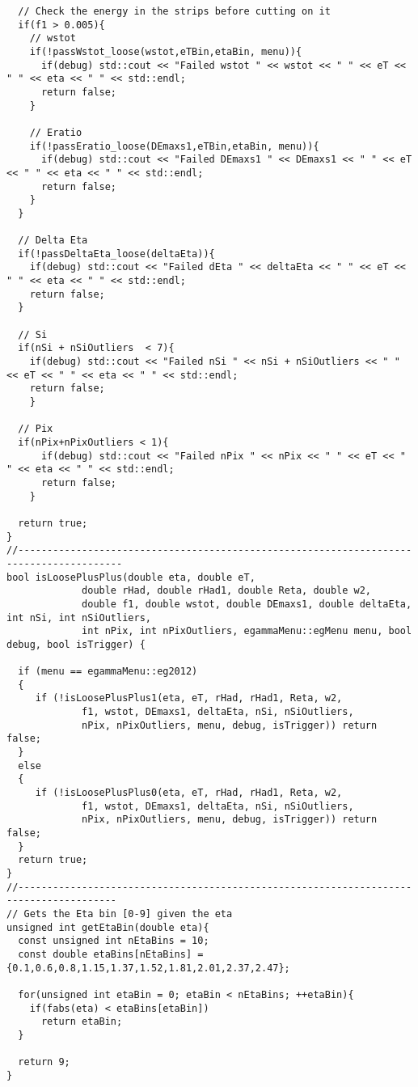 \begin{lstlisting}
  // Check the energy in the strips before cutting on it
  if(f1 > 0.005){
    // wstot
    if(!passWstot_loose(wstot,eTBin,etaBin, menu)){
      if(debug) std::cout << "Failed wstot " << wstot << " " << eT << " " << eta << " " << std::endl;
      return false;
    }

    // Eratio
    if(!passEratio_loose(DEmaxs1,eTBin,etaBin, menu)){
      if(debug) std::cout << "Failed DEmaxs1 " << DEmaxs1 << " " << eT << " " << eta << " " << std::endl;
      return false;
    }
  }
  
  // Delta Eta
  if(!passDeltaEta_loose(deltaEta)){
    if(debug) std::cout << "Failed dEta " << deltaEta << " " << eT << " " << eta << " " << std::endl;
    return false;
  }

  // Si
  if(nSi + nSiOutliers  < 7){
    if(debug) std::cout << "Failed nSi " << nSi + nSiOutliers << " " << eT << " " << eta << " " << std::endl;
    return false;
    }
 
  // Pix
  if(nPix+nPixOutliers < 1){
      if(debug) std::cout << "Failed nPix " << nPix << " " << eT << " " << eta << " " << std::endl;
      return false;
    }

  return true;
}
//----------------------------------------------------------------------------------------
bool isLoosePlusPlus(double eta, double eT,
		     double rHad, double rHad1, double Reta, double w2, 
		     double f1, double wstot, double DEmaxs1, double deltaEta, int nSi, int nSiOutliers, 
		     int nPix, int nPixOutliers, egammaMenu::egMenu menu, bool debug, bool isTrigger) {
  
  if (menu == egammaMenu::eg2012)
  {
     if (!isLoosePlusPlus1(eta, eT, rHad, rHad1, Reta, w2, 
		     f1, wstot, DEmaxs1, deltaEta, nSi, nSiOutliers, 
		     nPix, nPixOutliers, menu, debug, isTrigger)) return false; 
  }
  else
  {
     if (!isLoosePlusPlus0(eta, eT, rHad, rHad1, Reta, w2, 
		     f1, wstot, DEmaxs1, deltaEta, nSi, nSiOutliers, 
		     nPix, nPixOutliers, menu, debug, isTrigger)) return false; 
  } 
  return true;
}
//---------------------------------------------------------------------------------------
// Gets the Eta bin [0-9] given the eta
unsigned int getEtaBin(double eta){
  const unsigned int nEtaBins = 10;
  const double etaBins[nEtaBins] = {0.1,0.6,0.8,1.15,1.37,1.52,1.81,2.01,2.37,2.47};
  
  for(unsigned int etaBin = 0; etaBin < nEtaBins; ++etaBin){
    if(fabs(eta) < etaBins[etaBin])
      return etaBin;
  }
  
  return 9;
}


\end{lstlisting}
